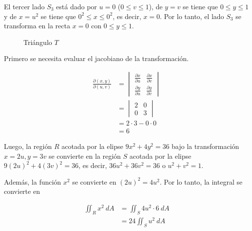 \documentclass[12pt]{exam}
\begin{document}
\begin{questions}
  El tercer lado $S_3$ está dado por $u=0$ ($0 \leq v \leq 1$), de $y=v$ se tiene que $0 \leq y \leq 1$ y de $x=u^2$ se tiene que $0^2 \leq x \leq 0^2$, es decir, $x=0$.
  Por lo tanto, el lado $S_3$ se transforma en la recta $x=0$ con $0 \leq y \leq 1$.

  \begin{figure}[H]
    \centering
    \caption{Triángulo $T$}
    \end{figure}
  

  Primero se necesita evaluar el jacobiano de la transformación. 

  \begin{align*}
    \frac{\partial(x, y)}{\partial(u, v)}
    &= \begin{vmatrix}
      \frac{\partial x}{\partial u} & \frac{\partial x}{\partial v}\\
      \frac{\partial y}{\partial u} & \frac{\partial y}{\partial v}
    \end{vmatrix}\\
    &= \begin{vmatrix}
      2 & 0\\
      0 & 3
    \end{vmatrix}\\
    &= 2 \cdot 3 - 0 \cdot 0\\
    &= 6
  \end{align*}

  Luego, la región $R$ acotada por la elipse $9x^2 + 4y^2 = 36$ bajo la transformación $x = 2u, y = 3v$ se convierte en la región $S$ acotada por la elipse 
  $9(2u)^2 + 4(3v)^2 = 36$, es decir, $36u^2 + 36v^2 = 36$ o $u^2 + v^2 = 1$.

  Además, la función $x^2$ se convierte en $(2u)^2 = 4u^2$. Por lo tanto, la integral se convierte en

  \begin{align*}
    \iint_R x^2~dA
    &= \iint_S 4u^2 \cdot 6~dA\\
    &= 24 \iint_S u^2~dA
  \end{align*}


\end{questions}
\end{document}
